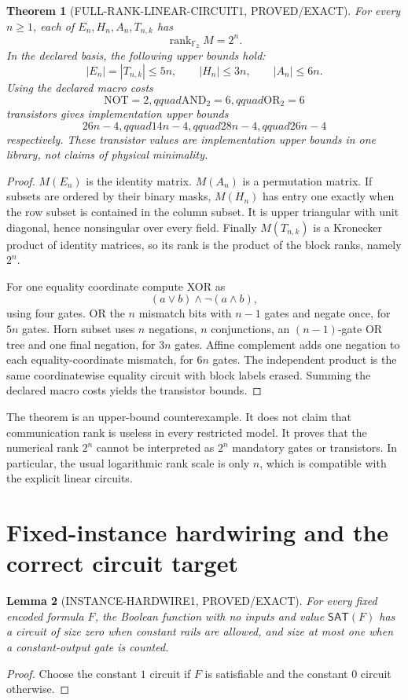\documentclass[11pt]{article}
\newtheorem{theorem}{Theorem}
\newtheorem{lemma}[theorem]{Lemma}
\newcommand{\SAT}{\mathsf{SAT}}
\newcommand{\Ftwo}{\mathbb F_2}
\begin{document}
\begin{theorem}[FULL-RANK-LINEAR-CIRCUIT1, PROVED/EXACT]
For every $n\ge1$, each of $E_n,H_n,A_n,T_{n,k}$ has
\[
 \operatorname{rank}_{\Ftwo}M=2^n.
\]
In the declared basis, the following upper bounds hold:
\[
 |E_n|=|T_{n,k}|\le5n,\qquad |H_n|\le3n,
 \qquad |A_n|\le6n.
\]
Using the declared macro costs
\[
 \mathrm{NOT}=2,qquad \mathrm{AND}_2=6,qquad
 \mathrm{OR}_2=6
\]
transistors gives implementation upper bounds
\[
 26n-4,qquad 14n-4,qquad 28n-4,qquad 26n-4
\]
respectively.  These transistor values are implementation upper bounds in
one library, not claims of physical minimality.
\end{theorem}

\begin{proof}
$M(E_n)$ is the identity matrix.  $M(A_n)$ is a permutation matrix.  If
subsets are ordered by their binary masks, $M(H_n)$ has entry one exactly
when the row subset is contained in the column subset.  It is upper
triangular with unit diagonal, hence nonsingular over every field.
Finally $M(T_{n,k})$ is a Kronecker product of identity matrices, so its rank
is the product of the block ranks, namely $2^n$.

For one equality coordinate compute XOR as
\[
 (a\lor b)\land\neg(a\land b),
\]
using four gates.  OR the $n$ mismatch bits with $n-1$ gates and negate once,
for $5n$ gates.  Horn subset uses $n$ negations, $n$ conjunctions, an
$(n-1)$-gate OR tree and one final negation, for $3n$ gates.  Affine
complement adds one negation to each equality-coordinate mismatch, for
$6n$ gates.  The independent product is the same coordinatewise equality
circuit with block labels erased.  Summing the declared macro costs yields
the transistor bounds.
\end{proof}

The theorem is an upper-bound counterexample.  It does not claim that
communication rank is useless in every restricted model.  It proves that
the numerical rank $2^n$ cannot be interpreted as $2^n$ mandatory gates or
transistors.  In particular, the usual logarithmic rank scale is only $n$,
which is compatible with the explicit linear circuits.

\section{Fixed-instance hardwiring and the correct circuit target}
\begin{lemma}[INSTANCE-HARDWIRE1, PROVED/EXACT]
For every fixed encoded formula $F$, the Boolean function with no inputs and
value $\SAT(F)$ has a circuit of size zero when constant rails are allowed,
and size at most one when a constant-output gate is counted.
\end{lemma}
\begin{proof}
Choose the constant $1$ circuit if $F$ is satisfiable and the constant $0$
circuit otherwise.
\end{proof}
\end{document}
